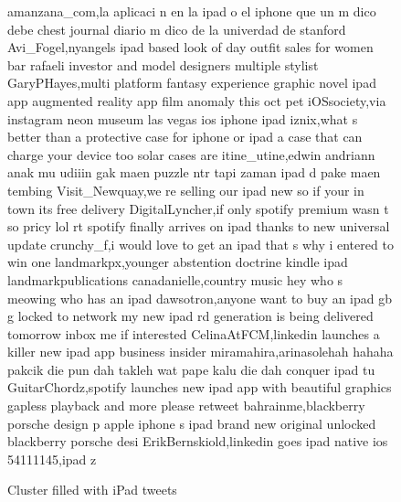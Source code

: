 \begin{figure}[htpb]
  \centering
    \begin{boxedverbatim}
    amanzana_com,la aplicaci n en la ipad o el iphone que un m dico debe chest journal diario m dico de la univerdad de stanford
    Avi_Fogel,nyangels ipad based look of day outfit sales for women bar rafaeli investor and model designers multiple stylist
    GaryPHayes,multi platform fantasy experience graphic novel ipad app augmented reality app film anomaly this oct pet
    iOSsociety,via instagram neon museum las vegas ios iphone ipad
    iznix,what s better than a protective case for iphone or ipad a case that can charge your device too solar cases are
    itine_utine,edwin andriann anak mu udiiin gak maen puzzle ntr tapi zaman ipad d pake maen tembing
    Visit_Newquay,we re selling our ipad new so if your in town its free delivery
    DigitalLyncher,if only spotify premium wasn t so pricy lol rt spotify finally arrives on ipad thanks to new universal update
    crunchy_f,i would love to get an ipad that s why i entered to win one
    landmarkpx,younger abstention doctrine kindle ipad landmarkpublications
    canadanielle,country music hey who s meowing who has an ipad
    dawsotron,anyone want to buy an ipad gb g locked to network my new ipad rd generation is being delivered tomorrow inbox me if interested
    CelinaAtFCM,linkedin launches a killer new ipad app business insider
    miramahira,arinasolehah hahaha pakcik die pun dah takleh wat pape kalu die dah conquer ipad tu
    GuitarChordz,spotify launches new ipad app with beautiful graphics gapless playback and more please retweet
    bahrainme,blackberry porsche design p apple iphone s ipad brand new original unlocked blackberry porsche desi
    ErikBernskiold,linkedin goes ipad native ios
    54111145,ipad z
    \end{boxedverbatim}
    \caption{Cluster filled with iPad tweets}
    \label{fig:cluster1}
\end{figure}
